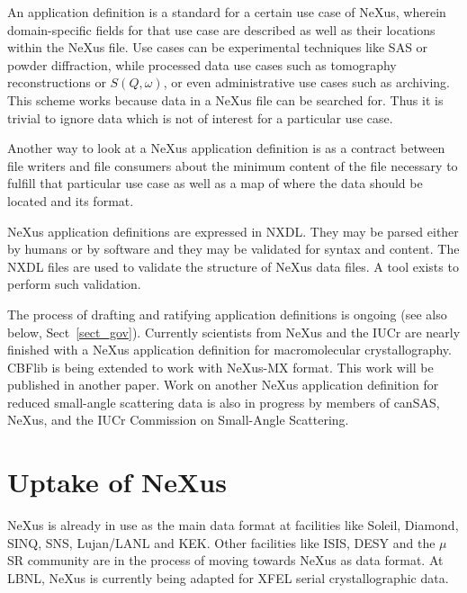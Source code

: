 \documentclass[%
 aip,
rsi,
 amsmath,amssymb,
 reprint,%
]{revtex4-1}
\begin{document}
An application definition is a standard for a certain use case of NeXus,
wherein domain-specific fields 
for that use case are described as well as their locations within the NeXus file.
Use cases can be experimental techniques like SAS or 
powder diffraction, while processed data use cases such as tomography reconstructions or $S(Q,\omega)$, 
or even administrative use cases such as archiving. This scheme works because data in a NeXus file 
can be searched for. Thus it is trivial to ignore data which is not of interest for a particular use case.

Another way to look at a NeXus application definition is as a contract between file writers and file consumers 
about the minimum content of the file necessary to fulfill that particular use case as well as a map of where the 
data should be located and its format.

NeXus application definitions are expressed in NXDL.  They may be parsed either by humans or by software and 
they may be validated for syntax and content.  The NXDL files are used to validate the structure of
NeXus data files. A tool exists to perform such validation.%

The process of drafting and ratifying application definitions
is ongoing (see also below, Sect~\ref{sect_gov}).
Currently scientists 
from NeXus and the IUCr are nearly finished with a NeXus application definition for macromolecular crystallography.
CBFlib\cite{cbflib} is being extended to work with NeXus-MX format. This work will be published in another paper. 
Work on another NeXus application definition for reduced small-angle scattering data
is also in progress\cite{cansas}  by members of 
canSAS, NeXus, and the IUCr Commission on Small-Angle Scattering.


\section{Uptake of NeXus} 

NeXus is already in use as the main data format at facilities like Soleil, Diamond, SINQ, SNS, Lujan/LANL 
and KEK. Other facilities like ISIS, DESY and the $\mu$SR community are in the process of moving towards 
NeXus as  data format. At LBNL, NeXus is currently being adapted for XFEL serial crystallographic data. 
\end{document}
